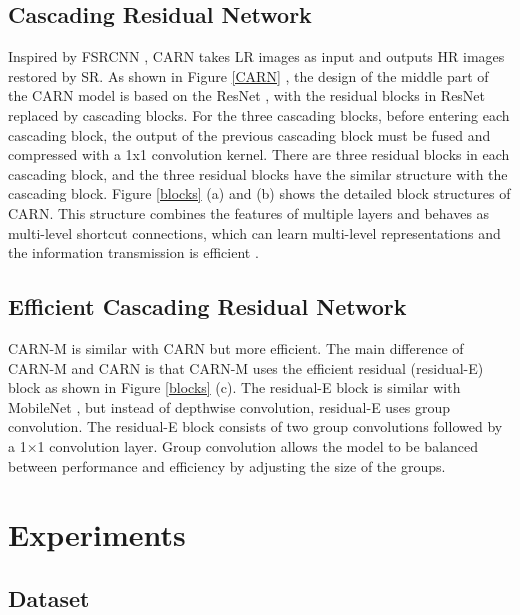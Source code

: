 \documentclass[final]{cvpr}
\begin{document}
\subsection{Cascading Residual Network}

Inspired by FSRCNN \cite{r5}, CARN takes LR images as input and outputs HR images restored by SR. As shown in Figure \ref{CARN} \cite{r1}, the design of the middle part of the CARN model is based on the ResNet \cite{r6}, with the residual blocks in ResNet replaced by cascading blocks. For the three cascading blocks, before entering each cascading block, the output of the previous cascading block must be fused and compressed with a 1x1 convolution kernel. There are three residual blocks in each cascading block, and the three residual blocks have the similar structure with the cascading block. Figure \ref{blocks} (a) and (b) shows the detailed block structures of CARN. This structure combines the features of multiple layers and behaves as multi-level shortcut connections, which can learn multi-level representations and the information transmission is efficient \cite{r1}. 



\subsection{Efficient Cascading Residual Network}

CARN-M is similar with CARN but more efficient. The main difference of CARN-M and CARN is that CARN-M uses the efficient residual (residual-E) block as shown in Figure \ref{blocks} (c). The residual-E block is similar with MobileNet \cite{r13}, but instead of depthwise convolution, residual-E uses group convolution. The residual-E block consists of two group convolutions followed by a 1×1 convolution layer. Group convolution allows the model to be balanced between performance and efficiency by adjusting the size of the groups.  

\section{Experiments} 

\subsection{Dataset}
\end{document}
